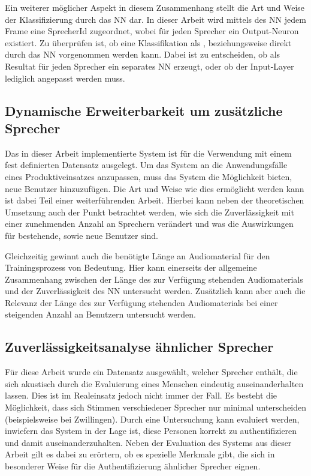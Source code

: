 Ein weiterer möglicher Aspekt in diesem Zusammenhang stellt die Art und Weise der Klassifizierung durch das \ac{NN} dar.
In dieser Arbeit wird mittels des \ac{NN} jedem Frame eine SprecherId zugeordnet, wobei für jeden Sprecher ein Output-Neuron existiert.
Zu überprüfen ist, ob eine Klassifikation als , beziehungsweise  direkt durch das \ac{NN} vorgenommen werden kann.
Dabei ist zu entscheiden, ob als Resultat für jeden Sprecher ein separates \ac{NN} erzeugt, oder ob der Input-Layer lediglich angepasst werden muss.

\subsection{Dynamische Erweiterbarkeit um zusätzliche Sprecher}
Das in dieser Arbeit implementierte System ist für die Verwendung mit einem fest definierten Datensatz ausgelegt.
Um das System an die Anwendungsfälle eines Produktiveinsatzes anzupassen, muss das System die Möglichkeit bieten, neue Benutzer hinzuzufügen.
Die Art und Weise wie dies ermöglicht werden kann ist dabei Teil einer weiterführenden Arbeit.
Hierbei kann neben der theoretischen Umsetzung auch der Punkt betrachtet werden, wie sich die Zuverlässigkeit mit einer zunehmenden Anzahl an Sprechern verändert und was die Auswirkungen für bestehende, sowie neue Benutzer sind.

Gleichzeitig gewinnt auch die benötigte Länge an Audiomaterial für den Trainingsprozess von Bedeutung.
Hier kann einerseits der allgemeine Zusammenhang zwischen der Länge des zur Verfügung stehenden Audiomaterials und der Zuverlässigkeit des \ac{NN} untersucht werden.
Zusätzlich kann aber auch die Relevanz der Länge des zur Verfügung stehenden Audiomaterials bei einer steigenden Anzahl an Benutzern untersucht werden.

\subsection{Zuverlässigkeitsanalyse ähnlicher Sprecher}
Für diese Arbeit wurde ein Datensatz ausgewählt, welcher Sprecher enthält, die sich akustisch durch die Evaluierung eines Menschen eindeutig auseinanderhalten lassen.
Dies ist im Realeinsatz jedoch nicht immer der Fall.
Es besteht die Möglichkeit, dass sich Stimmen verschiedener Sprecher nur minimal unterscheiden (beispielsweise bei Zwillingen).
Durch eine Untersuchung kann evaluiert werden, inwiefern das System in der Lage ist, diese Personen korrekt zu authentifizieren und damit auseinanderzuhalten.
Neben der Evaluation des Systems aus dieser Arbeit gilt es dabei zu erörtern, ob es spezielle Merkmale gibt, die sich in besonderer Weise für die Authentifizierung ähnlicher Sprecher eignen.

